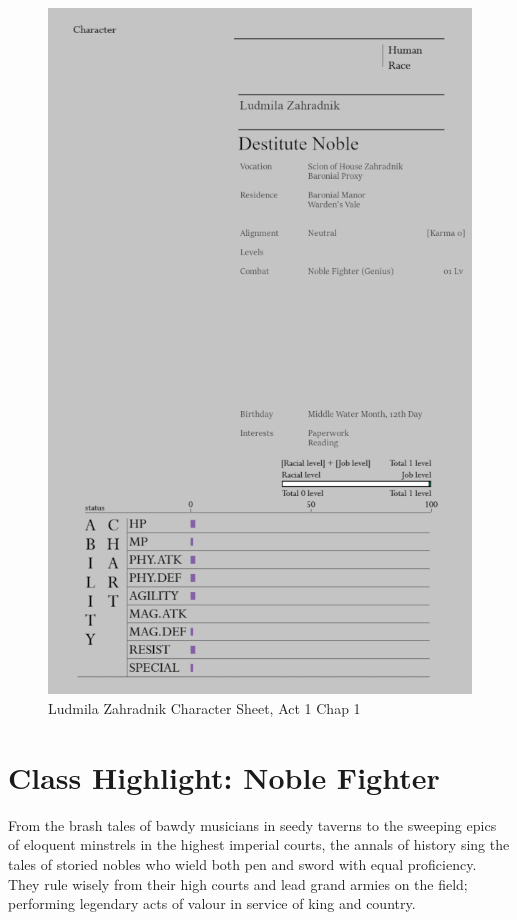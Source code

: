 
\begin{figure}
    \centering
    \includegraphics[width=0.9\linewidth]{images/9rood84.png}
    \caption*{Ludmila Zahradnik Character Sheet, Act 1 Chap 1}
\end{figure}

\section*{Class Highlight: Noble Fighter}
From the brash tales of bawdy musicians in seedy taverns to the sweeping epics of eloquent minstrels in the highest imperial courts, the annals of history sing the tales of storied nobles who wield both pen and sword with equal proficiency. They rule wisely from their high courts and lead grand armies on the field; performing legendary acts of valour in service of king and country.

